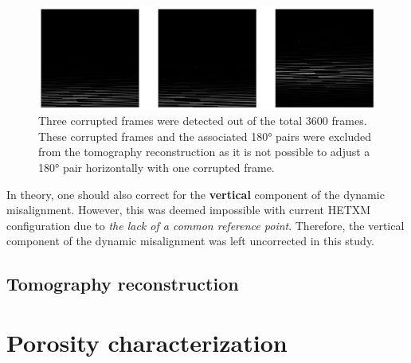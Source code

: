 \documentclass[12pt]{scrartcl}
\newcommand{\myscale}{1}
\begin{document}
\renewcommand{\myscale}{0.5}
\begin{figure}[htp]
\centering
\includegraphics[scale=\myscale]{corruptedFrames}
\caption{
Three corrupted frames were detected out of the total 3600 frames.
These corrupted frames and the associated \ang{180} pairs were excluded from the tomography reconstruction as it is not possible to adjust a \ang{180} pair horizontally with one corrupted frame.
}\label{fig: corrupted frames}
\end{figure}

In theory, one should also correct for the \textbf{vertical} component of the dynamic misalignment.
However, this was deemed impossible with current HETXM configuration due to \textit{the lack of a common reference point}.
Therefore, the vertical component of the dynamic misalignment was left uncorrected in this study.


\subsection{Tomography reconstruction}\label{sec: tomo recon}



\section{Porosity characterization}\label{sec: porosity characterization}
\end{document}
